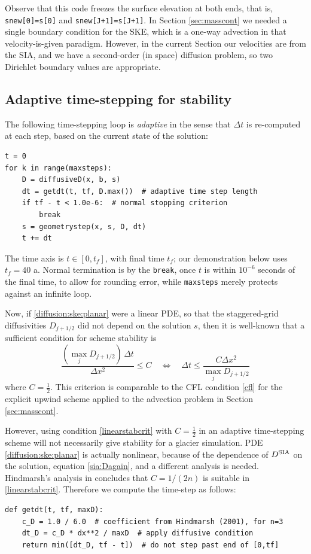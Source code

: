 \documentclass[letterpaper,final,12pt,reqno]{amsart}
\newcommand{\Dsia}{D^{\text{\textrm{SIA}}}}
\begin{document}
Observe that this code freezes the surface elevation at both ends, that is, \texttt{snew[0]=s[0]} and \texttt{snew[J+1]=s[J+1]}.  In Section \ref{sec:masscont} we needed a single boundary condition for the SKE, which is a one-way advection in that velocity-is-given paradigm.  However, in the current Section our velocities are from the SIA, and we have a second-order (in space) diffusion problem, so two Dirichlet boundary values \cite{MortonMayers2005} are appropriate. 

\subsection*{Adaptive time-stepping for stability}  The following time-stepping loop is \emph{adaptive} in the sense that $\Delta t$ is re-computed at each step, based on the current state of the solution:
\begin{lstlisting}[language=PythonPlus, xleftmargin=4mm]
t = 0
for k in range(maxsteps):
    D = diffusiveD(x, b, s)
    dt = getdt(t, tf, D.max())  # adaptive time step length
    if tf - t < 1.0e-6:  # normal stopping criterion
        break
    s = geometrystep(x, s, D, dt)
    t += dt
\end{lstlisting}
The time axis is $t\in [0,t_f]$, with final time $t_f$; our demonstration below uses $t_f=40$ a.  Normal termination is by the \texttt{break}, once $t$ is within $10^{-6}$ seconds of the final time, to allow for rounding error, while \texttt{maxsteps} merely protects against an infinite loop.

Now, if \eqref{diffusion:ske:planar} were a linear PDE, so that the staggered-grid diffusivities $D_{j+1/2}$ did not depend on the solution $s$, then it is well-known \cite{LeVeque2007,MortonMayers2005} that a sufficient condition for scheme stability is
\begin{equation}
   \frac{(\max_j D_{j+1/2})\,\Delta t}{\Delta x^2} \le C \quad \iff \quad \Delta t \le \frac{C \Delta x^2}{\max_j D_{j+1/2}}  \label{linearstabcrit}
\end{equation}
where $C = \frac{1}{2}$.  This criterion is comparable to the CFL condition \eqref{cfl} for the explicit upwind scheme applied to the advection problem in Section \ref{sec:masscont}.

However, using condition \eqref{linearstabcrit} with $C = \frac{1}{2}$ in an adaptive time-stepping scheme will not necessarily give stability for a glacier simulation.  PDE \eqref{diffusion:ske:planar} is actually nonlinear, because of the dependence of $\Dsia$ on the solution, equation \eqref{sia:Dagain}, and a different analysis is needed.  Hindmarsh's analysis in \cite{Hindmarsh2001} concludes that $C=1/(2n)$ is suitable in \eqref{linearstabcrit}.  Therefore we compute the time-step as follows:
\begin{lstlisting}[language=PythonPlus, xleftmargin=4mm]
def getdt(t, tf, maxD):
    c_D = 1.0 / 6.0  # coefficient from Hindmarsh (2001), for n=3
    dt_D = c_D * dx**2 / maxD  # apply diffusive condition
    return min([dt_D, tf - t])  # do not step past end of [0,tf]
\end{lstlisting}
\end{document}
